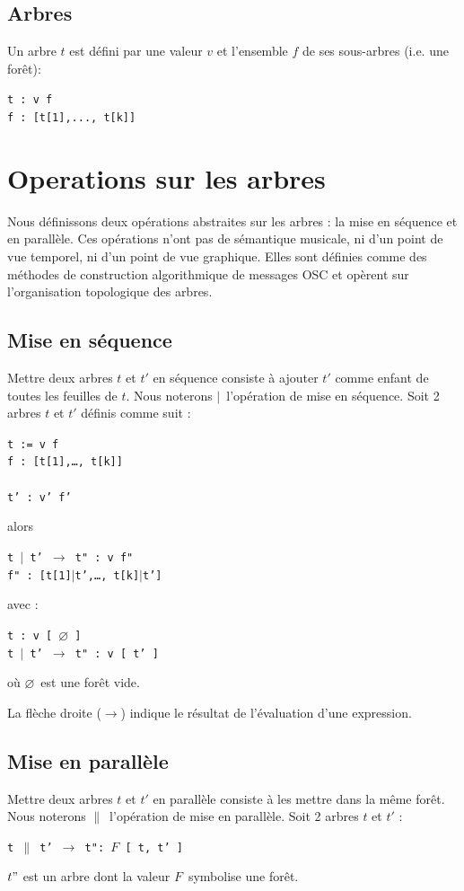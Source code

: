\documentclass{article}
\newcommand{\code}	[2][0.9]		{\vspace{0mm}\begin{center}\colorbox{mygrey}{
							\begin{minipage}[t]{#1\columnwidth} 
							{\small \texttt{#2}}
							\end{minipage}}\end{center}}
\newcommand{\op}	[1]		{\vspace{0mm}\begin{center}\colorbox{mygrey}{
							\begin{minipage}[t]{0.9\columnwidth} 
							{\small \texttt{#1}}
							\end{minipage}}\end{center}}
\newcommand{\nulltree}	{\ensuremath{\varnothing}}
\newcommand{\seq}		{\ensuremath{|}}
\newcommand{\paral}		{\ensuremath{\parallel}}
\newcommand{\foret}		{\ensuremath{F}}
\newcommand{\etc}		{…}
\begin{document}
\subsection{Arbres}
Un arbre $t$ est défini par une valeur $v$ et l’ensemble $f$ de ses sous-arbres (i.e. une forêt):
\code{t :  v f \\
f : [t[1],..., t[k]]
}



\section{Operations sur les arbres}

Nous définissons deux opérations abstraites sur les arbres : la mise en séquence et en parallèle. Ces opérations n'ont pas de sémantique musicale, ni d'un point de vue temporel, ni d'un point de vue graphique. Elles sont définies comme des méthodes de construction algorithmique de messages OSC et opèrent sur l'organisation topologique des arbres. 

\subsection{Mise en séquence}
Mettre deux arbres $t$ et $t'$ en séquence consiste à ajouter $t'$ comme enfant de toutes les feuilles de $t$.
Nous noterons \seq\ l'opération de mise en séquence. Soit 2 arbres $t$ et $t'$ définis comme suit :
\op{t :=  v f \\
f : [t[1],\etc, t[k]] \\
\\
t' :  v' f'
}
alors
\op{t \seq\ t'  $\to$  t" : v f" \\
f" : [t[1]\seq t',\etc, t[k]\seq t']
}
avec : 
\op{t :  v [ \nulltree\ ]\\
t \seq\ t'  $\to$  t" : v [ t' ]
}
où \nulltree\ est une forêt vide.

La flèche droite ($\to$) indique le résultat de l'évaluation d'une expression.

\subsection{Mise en parallèle}
Mettre deux arbres $t$ et $t'$ en parallèle consiste à les mettre dans la même forêt.
Nous noterons \paral\ l'opération de mise en parallèle. 
Soit 2 arbres $t$ et $t'$ :
\op{t \paral\ t'  $\to$  t": \foret\ [ t, t' ]
}
$t"$ est un arbre dont la valeur \foret\ symbolise une forêt. 
\end{document}

